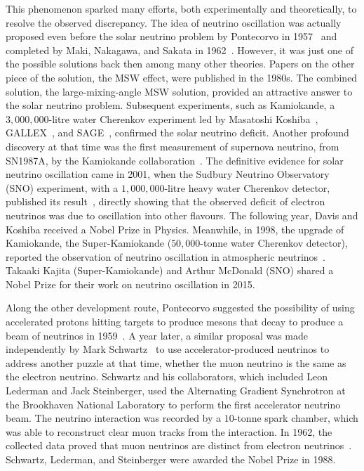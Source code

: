 This phenomenon sparked many efforts, both experimentally and theoretically, to resolve the observed discrepancy.
The idea of neutrino oscillation was actually proposed even before the solar neutrino problem by Pontecorvo in 1957~\cite{Pontecorvo:1957qd} and completed by Maki, Nakagawa, and Sakata in 1962~\cite{Maki:1962mu}.
However, it was just one of the possible solutions back then among many other theories.
Papers on the other piece of the solution, the MSW effect, were published in the 1980s.
The combined solution, the large-mixing-angle MSW solution, provided an attractive answer to the solar neutrino problem.
Subsequent experiments, such as Kamiokande, a $3,000,000$-litre water Cherenkov experiment led by Masatoshi Koshiba~\cite{Kamiokande-II:1989hkh}, GALLEX~\cite{GALLEX:1998kcz}, and SAGE~\cite{SAGE:1999nng}, confirmed the solar neutrino deficit.
Another profound discovery at that time was the first measurement of supernova neutrino, from SN1987A, by the Kamiokande collaboration~\cite{Kamiokande-II:1987idp}.
The definitive evidence for solar neutrino oscillation came in 2001, when the Sudbury Neutrino Observatory (SNO) experiment, with a $1,000,000$-litre heavy water Cherenkov detector, published its result~\cite{SNO:2001kpb}, directly showing that the observed deficit of electron neutrinos was due to oscillation into other flavours.
The following year, Davis and Koshiba received a Nobel Prize in Physics.
Meanwhile, in 1998, the upgrade of Kamiokande, the Super-Kamiokande ($50,000$-tonne water Cherenkov detector), reported the observation of neutrino oscillation in atmospheric neutrinos~\cite{Super-Kamiokande:1998kpq}.
Takaaki Kajita (Super-Kamiokande) and Arthur McDonald (SNO) shared a Nobel Prize for their work on neutrino oscillation in 2015.

Along the other development route, Pontecorvo suggested the possibility of using accelerated protons hitting targets to produce mesons that decay to produce a beam of neutrinos in 1959~\cite{Pontecorvo:1959sn}.
A year later, a similar proposal was made independently by Mark Schwartz~\cite{Schwartz:1960hg} to use accelerator-produced neutrinos to address another puzzle at that time, whether the muon neutrino is the same as the electron neutrino.
Schwartz and his collaborators, which included Leon Lederman and Jack Steinberger, used the Alternating Gradient Synchrotron at the Brookhaven National Laboratory to perform the first accelerator neutrino beam.
The neutrino interaction was recorded by a $10$-tonne spark chamber, which was able to reconstruct clear muon tracks from the interaction.
In 1962, the collected data proved that muon neutrinos are distinct from electron neutrinos~\cite{Danby:1962nd}.
Schwartz, Lederman, and Steinberger were awarded the Nobel Prize in 1988.

